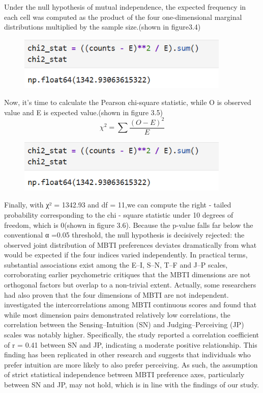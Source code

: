 \documentclass[12pt]{article}
\begin{document}
	Under the null hypothesis of mutual independence, the expected frequency in each cell was computed as the product of the four one-dimensional marginal distributions multiplied by the sample size.(shown in figure3.4)
	\begin{figure}[H]
		\centering
		\includegraphics[width=0.9\textwidth]{Q1P10}
		
	\end{figure}
	Now, it’s time to calculate the Pearson chi-square statistic, while O is observed value and E is expected value.(shown in figure 3.5)
	\[
	\chi^2 = \sum \frac{(O - E)^2}{E}
	\]
	\begin{figure}[H]
		\centering
		\includegraphics[width=0.9\textwidth]{Q1P10}
		
	\end{figure}
	Finally, with χ² = 1342.93 and df = 11,we can compute the right - tailed probability corresponding to the chi - square statistic under 10 degrees of freedom, which is 0(shown in figure 3.6). Because the p-value falls far below the conventional α =0.05 threshold, the null hypothesis is decisively rejected: the observed joint distribution of MBTI preferences deviates dramatically from what would be expected if the four indices varied independently. In practical terms, substantial associations exist among the E–I, S–N, T–F and J–P scales, corroborating earlier psychometric critiques that the MBTI dimensions are not orthogonal factors but overlap to a non-trivial extent. Actually, some researchers had also proven that the four dimensions of MBTI are not independent. \textcite{fleenor1997relationship} investigated the intercorrelations among MBTI continuous scores and found that while most dimension pairs demonstrated relatively low correlations, the correlation between the Sensing–Intuition (SN) and Judging–Perceiving (JP) scales was notably higher. Specifically, the study reported a correlation coefficient of r = 0.41 between SN and JP, indicating a moderate positive relationship. This finding has been replicated in other research and suggests that individuals who prefer intuition are more likely to also prefer perceiving. As such, the assumption of strict statistical independence between MBTI preference axes, particularly between SN and JP, may not hold, which is in line with the findings of our study.
\end{document}
